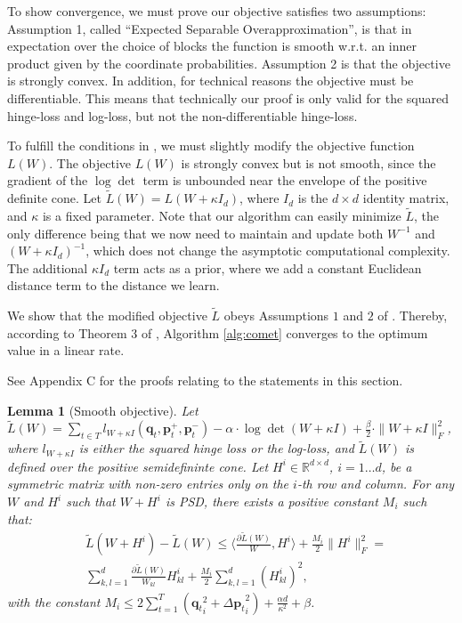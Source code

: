 \documentclass{article} %
\newcommand\mat[1]{{#1}}
\renewcommand\vec[1]{\mathbf{#1}}
\newcommand{\W}{\mat{W}}
\newcommand{\Hh}{\mat{H}}
\newcommand{\R}{\mathbb{R}}
\newcommand{\tL}{\tilde{L}(\W)}
\newcommand{\frobsq}[1]{{\|#1\|_F^2}}
\newcommand{\q}{{\vec{q}}}
\newcommand{\trip}{{t}}
\newcommand{\qt}{{\q_{\trip}}}
\newcommand{\grd}{\frac{\partial \tL}{\W}}
\newcommand{\grdkl}{\frac{\partial \tL}{\W_{kl}}}
\newtheorem{lemma}{Lemma}
\begin{document}
To show convergence, we must prove our objective satisfies two assumptions: Assumption 1, called ``Expected Separable Overapproximation'', is that in expectation over the choice of blocks the function is smooth w.r.t. an inner product given by the coordinate probabilities. Assumption 2 is that the objective is strongly convex. In addition, for technical reasons the objective must be differentiable. This means that technically our proof is only valid for the squared hinge-loss and log-loss, but not the non-differentiable hinge-loss.

To fulfill the conditions in \cite{richtarik2013optimal}, we must slightly modify the objective function $L({\W})$. The objective $L(\W)$ is strongly convex but is not smooth, since the gradient of the $\log \det$ term is unbounded near the envelope of the positive definite cone. Let $\tilde{L}({\W}) = L({\W + \kappa I_d})$, where $I_d$ is the $d \times d$ identity matrix, and $\kappa$ is a fixed parameter.
Note that our algorithm can easily minimize $\tilde{L}$, the only difference being that we now need to maintain and update both $\W^{-1}$ and $(\W+\kappa I_d)^{-1}$, which does not change the asymptotic computational complexity. The additional $\kappa I_d$ term acts as a prior, where we add a constant Euclidean distance term to the distance we learn. 

We show that the modified objective $\tilde{L}$ obeys Assumptions $1$ and $2$ of \citet{richtarik2013optimal}. Thereby, according to Theorem 3 of \citeauthor{richtarik2013optimal}, Algorithm \ref{alg:comet} converges to the optimum value in a linear rate.

See Appendix C for the proofs relating to the statements in this section.
\begin{lemma}[Smooth objective]
\label{lem:smooth}
Let 
$\tL=\sum\limits_{t\in T}{l_{\W + \kappa I}(\vec{q}_t, \vec{p}_{t}^{+}, \vec{p}_{t}^{-})} -
\alpha \cdot \log \det(\W + \kappa I) + \tfrac{\beta}{2}  \cdot \| \W + \kappa I \|_{F}^{2}$, 
where $l_{\W + \kappa I}$ is either the squared hinge loss or the log-loss, and $\tL$ is defined over the positive semidefininte cone. 
Let $\Hh^i \in \R^{d \times d}$, $i=1 \ldots d$, be a symmetric matrix with non-zero entries only on the $i$-th row and column.
For any $\W$ and $\Hh^i$ such that $\W + \Hh^i$ is PSD, there exists a positive constant $M_i$ such that:
\begin{align}
\label{eq:ineq}
&\tilde{L}(\W + \Hh^i) - \tL \leq  \langle \grd, \Hh^i \rangle + \frac{M_i}{2} \frobsq{\Hh^i} = \\
& \sum_{k,l=1}^d  \grdkl \Hh_{kl}^i + \frac{M_i}{2} \sum_{k,l=1}^d  (\Hh_{kl}^i)^2, \nonumber
\end{align}
with the constant $M_i \leq  2 \sum_{t=1}^T (\qt_i^2 +{\Delta\vec{p}_{t}}_i^2) + \frac{\alpha d}{\kappa ^2} + \beta$.
\end{lemma}
\end{document}
